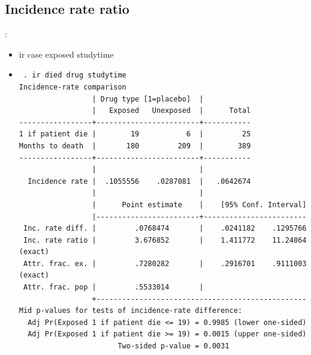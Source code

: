 \subsection{Incidence rate ratio}
\begin{frame}[fragile]{\secname: \subsecname}	
\begin{itemize}
\item ir case exposed studytime
\item[] \scriptsize \begin{verbatim}
 . ir died drug studytime
Incidence-rate comparison
                 | Drug type [1=placebo]  |
                 |   Exposed   Unexposed  |      Total
-----------------+------------------------+-----------
1 if patient die |        19           6  |         25
Months to death  |       180         209  |        389
-----------------+------------------------+-----------
                 |                        |
  Incidence rate |  .1055556    .0287081  |   .0642674
                 |                        |
                 |      Point estimate    |    [95% Conf. Interval]
                 |------------------------+------------------------
 Inc. rate diff. |         .0768474       |    .0241182    .1295766 
 Inc. rate ratio |         3.676852       |    1.411772    11.24864 (exact)
 Attr. frac. ex. |         .7280282       |    .2916701    .9111003 (exact)
 Attr. frac. pop |         .5533014       |
                 +-------------------------------------------------
Mid p-values for tests of incidence-rate difference:
  Adj Pr(Exposed 1 if patient die <= 19) = 0.9985 (lower one-sided)
  Adj Pr(Exposed 1 if patient die >= 19) = 0.0015 (upper one-sided)
                       Two-sided p-value = 0.0031
	
 \end{verbatim}
 \end{itemize}
\end{frame}





